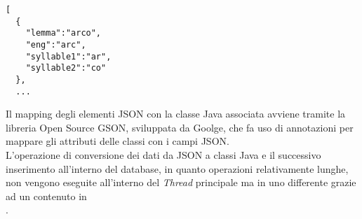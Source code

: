 \begin{lstlisting}[float, caption=Porzione del file \code{words.json}, label=lst:words_json]
[
  {
    "lemma":"arco",
    "eng":"arc",
    "syllable1":"ar",
    "syllable2":"co"
  },
  ...
\end{lstlisting}

Il mapping degli elementi JSON con la classe Java associata avviene tramite la libreria Open Source GSON, sviluppata da Goolge, che fa uso di annotazioni per mappare gli attributi delle classi con i campi JSON.\\
L'operazione di conversione dei dati da JSON a classi Java e il successivo inserimento all'interno del database, in quanto operazioni relativamente lunghe, non vengono eseguite all'interno del \textit{Thread} principale ma in uno differente grazie ad un  contenuto in \\. 

